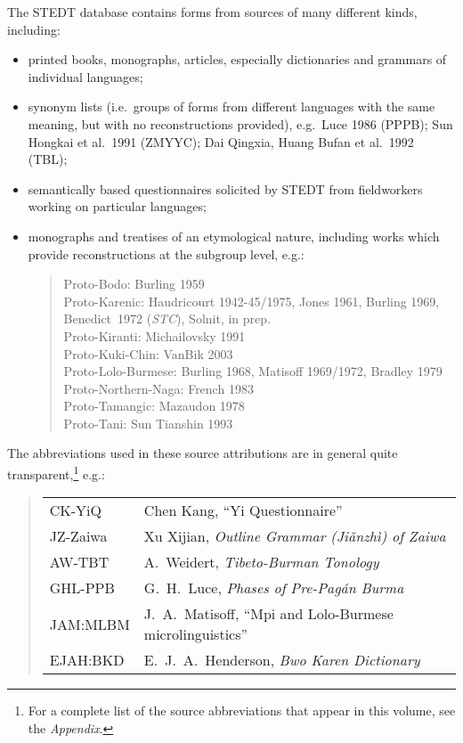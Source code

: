 The STEDT database contains forms from sources of many different kinds,
including:
\begin{itemize}
\item printed books, monographs, articles, especially dictionaries and grammars of
individual languages;
\item synonym lists (i.e.\ groups of forms from different languages with the same
meaning, but with no reconstructions provided), e.g.\ Luce 1986 (PPPB); Sun
Hongkai et al.\ 1991 (ZMYYC); Dai Qingxia, Huang Bufan et al.\ 1992 (TBL);
\item semantically based questionnaires solicited by STEDT from fieldworkers working
on particular languages;
\item monographs and treatises of an etymological nature, including works which
provide reconstructions at the subgroup level, e.g.:

\begin{verse}
Proto-Bodo: Burling 1959\\
Proto-Karenic: Haudricourt 1942-45/1975, Jones 1961, Burling 1969, Benedict~1972 (\textit{STC}), Solnit, in prep.\\
Proto-Kiranti: Michailovsky 1991\\
Proto-Kuki-Chin: VanBik 2003\\
Proto-Lolo-Burmese: Burling 1968, Matisoff 1969/1972, Bradley 1979\\
Proto-Northern-Naga: French 1983\\
Proto-Tamangic: Mazaudon 1978\\
Proto-Tani: Sun Tianshin 1993\\
\end{verse}
\end{itemize}


The abbreviations used in these source attributions are in general quite
transparent,\footnote{For a complete list of the source abbreviations that
appear in this volume, see the \textit{Appendix}.} e.g.:

\begin{quote}
\begin{tabular}{ll}
CK-YiQ	&Chen Kang, “Yi Questionnaire”\\
JZ-Zaiwa	&Xu Xijian, \textit{Outline Grammar (Jiǎnzhì) of Zaiwa}\\
AW-TBT	&A.~Weidert, \textit{Tibeto-Burman Tonology}\\
GHL-PPB	&G.~H.~Luce, \textit{Phases of Pre-Pagán Burma}\\
JAM:MLBM	&J.~A.~Matisoff, “Mpi and Lolo-Burmese microlinguistics”\\
EJAH:BKD	&E.~J.~A.~Henderson, \textit{Bwo Karen Dictionary}\\
\end{tabular}
\end{quote}


